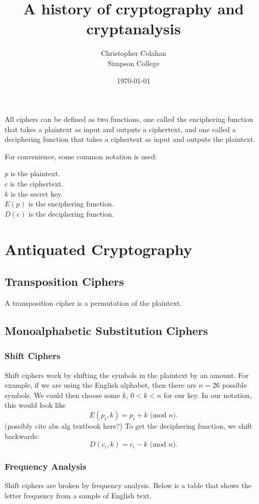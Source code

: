 \documentclass[12pt]{article}
\title{A history of cryptography and cryptanalysis}
\date{\today}
\author{Christopher Colahan\\ Simpson College}
\begin{document}
\maketitle
\newpage

\tableofcontents
\newpage


All ciphers can be defined as two functions, one called the enciphering function that takes a plaintext as input and outputs a ciphertext, and one called a deciphering function that takes a ciphertext as input and outputs the plaintext.

For convenience, some common notation is used:

{\centering
	$p$ is the plaintext.\\
	$c$ is the ciphertext.\\
	$k$ is the secret key.\\
	$E(p)$ is the enciphering function.\\
	$D(c)$ is the deciphering function.\\
}

\section{Antiquated Cryptography}
\subsection{Transposition Ciphers}
A transposition cipher is a permutation of the plaintext.

\subsection{Monoalphabetic Substitution Ciphers}

\subsubsection{Shift Ciphers}
Shift ciphers work by shifting the symbols in the plaintext by an amount. For example, if we are using the English alphabet, then there are $n=26$ possible symbols. We could then choose some $k$, $0<k<n$ for our key. In our notation, this would look like
$$E(p_i,k)=p_i+k\text{ (mod $n$)}.$$ (possibly cite abs alg textbook here?)
To get the deciphering function, we shift backwards:
$$D(c_i,k)=c_i-k\text{ (mod $n$)}.$$

\subsubsection{Frequency Analysis}
Shift ciphers are broken by frequency analysis. Below is a table that shows the letter frequency from a sample of English text.
\end{document}
